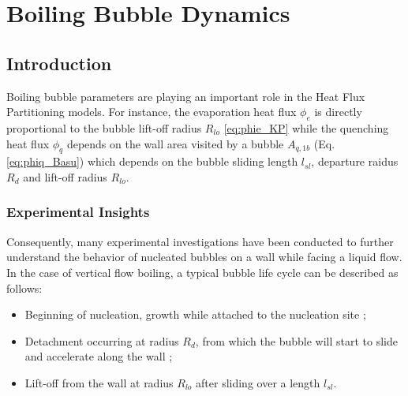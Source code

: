 
\chapter{Boiling Bubble Dynamics} %

\label{ch:bub_dyn} %


\section{Introduction}

Boiling bubble parameters are playing an important role in the Heat Flux Partitioning models. For instance, the evaporation heat flux $\phi_{e}$ is directly proportional to the bubble lift-off radius $R_{lo}$ \ref{eq:phie_KP} while the quenching heat flux $\phi_{q}$ depends on the wall area visited by a bubble $A_{q,1b}$ (Eq. \ref{eq:phiq_Basu}) which depends on the bubble sliding length $l_{sl}$, departure raidus $R_{d}$ and lift-off radius $R_{lo}$.

\subsection{Experimental Insights}

Consequently, many experimental investigations have been conducted to further understand the behavior of nucleated bubbles on a wall while facing a liquid flow. In the case of vertical flow boiling, a typical bubble life cycle can be described as follows:

\begin{itemize}
\item Beginning of nucleation, growth while attached to the nucleation site ;

\item Detachment occurring at radius $R_{d}$, from which the bubble will start to slide and accelerate along the wall ;

\item Lift-off from the wall at radius $R_{lo}$ after sliding over a length $l_{sl}$.

\end{itemize}



